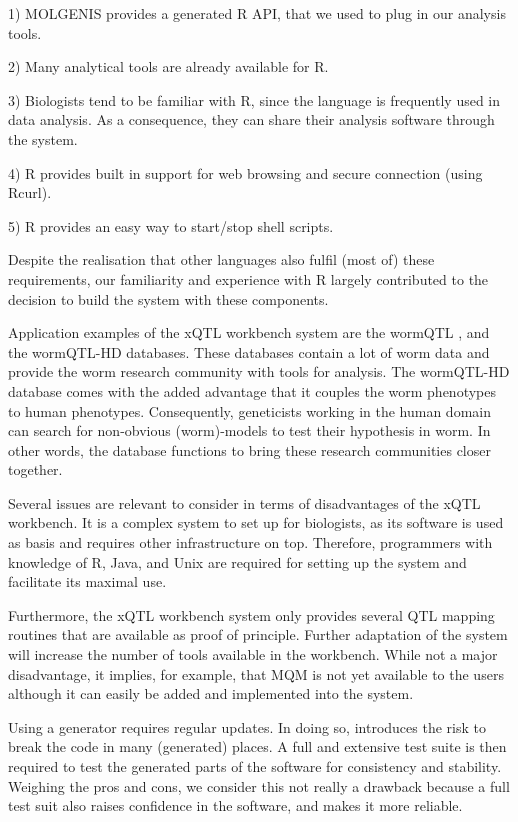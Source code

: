 1) MOLGENIS provides a generated R API, that we used to plug in our analysis tools.

2) Many analytical tools are already available for R.

3) Biologists tend to be familiar with R, since the language is frequently used in data analysis. As a consequence, they can share their analysis software through the system.

4) R provides built in support for web browsing and secure connection (using Rcurl).

5) R provides an easy way to start/stop shell scripts.

Despite the realisation that other languages also fulfil (most of) these requirements, our familiarity and experience with R largely 
contributed to the decision to build the system with these components.

Application examples of the xQTL workbench system are the wormQTL \cite{Snoek:2012}, and the wormQTL-HD \cite{vanDerVelde:2014} databases. These databases 
contain a lot of worm data and provide the worm research community with tools for analysis. The wormQTL-HD database comes with the added advantage that 
it couples the worm phenotypes to human phenotypes. Consequently, geneticists working in the human domain can search for non-obvious (worm)-models to test 
their hypothesis in worm. In other words, the database functions to bring these research communities closer together.

Several issues are relevant to consider in terms of disadvantages of the xQTL workbench. It is a complex system to set up for biologists, as its software 
is used as basis and requires other infrastructure on top. Therefore, programmers with knowledge of R, Java, and Unix are required for setting up the 
system and facilitate its maximal use.

Furthermore, the xQTL workbench system only provides several QTL mapping routines that are available as proof of principle. Further adaptation of the 
system will increase the number of tools available in the workbench. While not a major disadvantage, it implies, for example, that MQM is not yet 
available to the users although it can easily be added and implemented into the system.

Using a generator requires regular updates. In doing so, introduces the risk to break the code in many (generated) places. A full and extensive test 
suite is then required to test the generated parts of the software for consistency and stability. Weighing the pros and cons, we consider this not 
really a drawback because a full test suit also raises confidence in the software, and makes it more reliable. 

